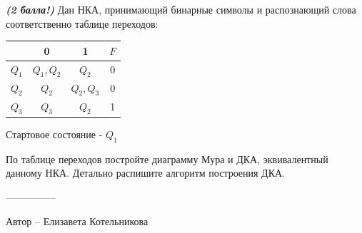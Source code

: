 \question
\textbf{\textit{(2 балла!)}} Дан НКА, принимающий бинарные символы и распознающий слова соответственно таблице переходов:

\begin{tabular}{||c | c c c||} 
 \hline
 & 0 & 1 & $F$ \\ 
 \hline\hline
 $Q_1$ & $Q_1, Q_2$ & $Q_2$ & 0 \\ 
 \hline
 $Q_2$ &  $Q_2$ & $Q_2, Q_3$ & 0 \\
 \hline
 $Q_3$ & $Q_3$ & $Q_2$ & 1 \\
 \hline
\end{tabular}

Стартовое состояние - $Q_1$

По таблице переходов постройте диаграмму Мура и ДКА, эквивалентный данному НКА. Детально распишите алгоритм построения ДКА.

---------------

Автор -- Елизавета Котельникова
